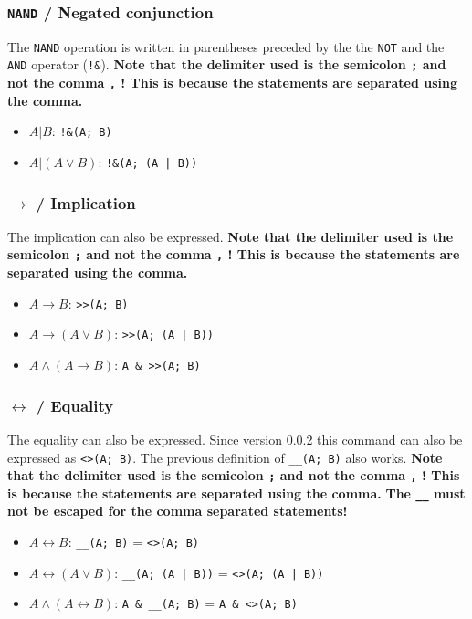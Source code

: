 \documentclass[a4paper]{article}
\begin{document}
\subsubsection{\texttt{NAND} / Negated conjunction}

The \texttt{NAND} operation is written in parentheses preceded by the the \texttt{NOT} and the \texttt{AND} operator (\texttt{!\&}). \textbf{Note that the delimiter used is the semicolon \texttt{;} and not the comma \texttt{,} ! This is because the statements are separated using the comma.}

\begin{itemize}
	\item $A | B$:  \texttt{!\&(A; B)}
	\item $A | (A \lor B)$: \texttt{!\&(A; (A | B))}
\end{itemize}

\subsubsection{$\rightarrow$ / Implication}

The implication can also be expressed. \textbf{Note that the delimiter used is the semicolon \texttt{;} and not the comma \texttt{,} ! This is because the statements are separated using the comma.}

\begin{itemize}
	\item $A \rightarrow B$:  \texttt{>>(A; B)}
	\item $A \rightarrow (A \lor B)$: \texttt{>>(A; (A | B))}
	\item $A \land (A \rightarrow B)$: \texttt{A \& >>(A; B)}
\end{itemize}

\subsubsection{$\leftrightarrow$ / Equality}

The equality can also be expressed. Since version 0.0.2 this command can also be expressed as \texttt{<>(A;~B)}. The previous definition of \texttt{\_\_(A;~B)} also works. \textbf{Note that the delimiter used is the semicolon \texttt{;} and not the comma \texttt{,} ! This is because the statements are separated using the comma.} \textbf{The \texttt{\_\_} must not be escaped for the comma separated statements!}

\begin{itemize}
	\item $A \leftrightarrow B$:  \texttt{\_\_(A; B)} = \texttt{<>(A; B)}
	\item $A \leftrightarrow (A \lor B)$: \texttt{\_\_(A; (A | B))} = \texttt{<>(A; (A | B))}
	\item $A \land (A \leftrightarrow B)$: \texttt{A \& \_\_(A; B)} = \texttt{A \& <>(A; B)}
\end{itemize}
\end{document}
